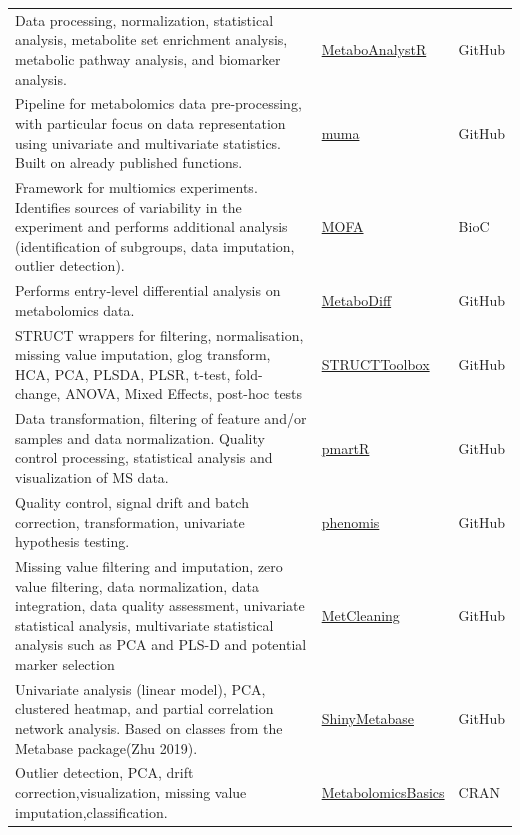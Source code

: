 \documentclass[]{article}
\begin{document}
\begin{longtable}[t]{>{\raggedright\arraybackslash}p{30em}>{\raggedright\arraybackslash}p{10em}>{\raggedright\arraybackslash}p{3em}}
\rowcolor{gray!6}  Data processing, normalization, statistical analysis, metabolite set enrichment analysis, metabolic pathway analysis, and biomarker analysis. & \href{https://github.com/xia-lab/MetaboAnalystR}{MetaboAnalystR} & GitHub\\
Pipeline for metabolomics data pre-processing, with particular focus on data representation using univariate and multivariate statistics. Built on already published functions. & \href{https://cran.r-project.org/web/packages/muma/index.html}{muma} & GitHub\\
\rowcolor{gray!6}  Framework for multiomics experiments. Identifies sources of variability in the experiment and performs additional analysis (identification of subgroups, data imputation, outlier detection). & \href{https://www.bioconductor.org/packages/release/bioc/html/MOFA.html}{MOFA} & BioC\\
Performs entry-level differential analysis on metabolomics data. & \href{https://github.com/andreasmock/MetaboDiff}{MetaboDiff} & GitHub\\
\rowcolor{gray!6}  STRUCT wrappers for filtering, normalisation, missing value imputation, glog transform, HCA, PCA, PLSDA, PLSR, t-test, fold-change, ANOVA, Mixed Effects, post-hoc tests & \href{https://github.com/computational-metabolomics/structToolbox}{STRUCTToolbox} & GitHub\\
Data transformation, filtering of feature and/or samples and data normalization. Quality control processing, statistical analysis and visualization of MS data. & \href{https://github.com/pmartR/pmartR}{pmartR} & GitHub\\
\rowcolor{gray!6}  Quality control, signal drift and batch correction, transformation, univariate hypothesis testing. & \href{https://github.com/ethevenot/phenomis}{phenomis} & GitHub\\
Missing value filtering and imputation, zero value filtering, data normalization, data integration, data quality assessment, univariate statistical analysis, multivariate statistical analysis such as PCA and PLS-D and potential marker selection & \href{https://github.com/MetabLAB/MetCleaning}{MetCleaning} & GitHub\\
\rowcolor{gray!6}  Univariate analysis (linear model), PCA, clustered heatmap, and partial correlation network analysis. Based on classes from the Metabase package(Zhu 2019). & \href{https://github.com/zhuchcn/ShinyMetabase}{ShinyMetabase} & GitHub\\
Outlier detection, PCA, drift correction,visualization, missing value imputation,classification. & \href{https://cran.r-project.org/package=MetabolomicsBasics}{MetabolomicsBasics} & CRAN\\

\end{longtable}
\end{document}

